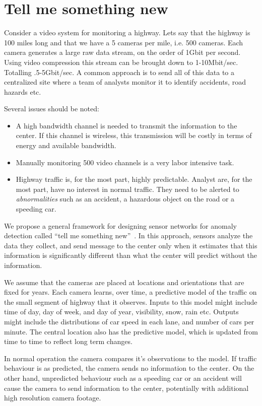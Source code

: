 \section{Tell me something new}

Consider a video system for monitoring a highway. Lets say that the
highway is 100 miles long and that we have a 5 cameras per mile,
i.e. 500 cameras. Each camera generates a large raw data stream, on
the order of 1Gbit per second. Using video compression this stream can
be brought down to 1-10Mbit/sec. Totalling .5-5Gbit/sec. A common approach
is to send all of this data to a centralized site where a team of
analysts monitor it to identify accidents, road hazards etc.

Several issues should be noted:
\begin{itemize}
\item A high bandwidth channel is needed to transmit the information
  to the center. If this channel is wireless, this transmission will
  be costly in terms of energy and available bandwidth.
\item Manually monitoring 500 video channels is a very labor intensive task. 
\item Highway traffic is, for the most part, highly
  predictable. Analyst are, for the most part, have no interest in normal traffic. 
  They need to be alerted to {\em abnormalities} such as an accident, a hazardous 
  object on the road or a speeding car.
\end{itemize}

We propose a general framework for designing sensor networks for
anomaly detection called ``tell me something new''~\cite{TMSN}. In
this approach, sensors analyze the data they collect, and send message
to the center only when it estimates that this information is
significantly different than what the center will predict without the
information.

We assume that the cameras are placed at locations and orientations that are fixed for years.
Each camera learns, over time, a predictive model of the traffic on the small segment of 
highway that it observes. Inputs to this model might include time of day, day of week, and day of year, visibility, snow, rain etc. Outputs might include the distributions of car speed in each lane, and number of cars per minute.
The central location also has the predictive model, which is updated from time to time to reflect long term changes. 

In normal operation the camera compares it's observations to the model. If traffic behaviour is as predicted, the camera sends no information to the center. On the other hand, unpredicted behaviour such as a speeding car or an accident will cause the camera to send information to the center, potentially with additional high resolution camera footage.

